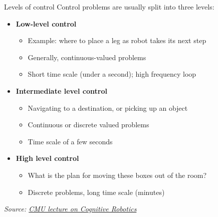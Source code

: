 \documentclass[compress]{beamer}
\newcommand{\source}[2]{{\tiny\it Source: \href{#1}{#2}}}
\begin{document}



\begin{frame}{Levels of control}
    Control problems are usually split into three levels:

    \begin{itemize}
        \item<1-> \textbf{Low-level control}
            \begin{itemize}
                \item Example: where to place a leg as robot takes its next step
                \item Generally, continuous-valued problems
                \item Short time scale (under a second); high frequency loop
            \end{itemize}
        \item<2-> \textbf{Intermediate level control}
            \begin{itemize}
                \item Navigating to a destination, or picking up an object
                \item Continuous or discrete valued problems
                \item Time scale of a few seconds
            \end{itemize}
        \item<3-> \textbf{High level control}
            \begin{itemize}
                \item What is the plan for moving these boxes out of the room?
                \item Discrete problems, long time scale (minutes)
            \end{itemize}
    \end{itemize}

    \source{https://www.cs.cmu.edu/afs/cs/academic/class/15494-s11/lectures/architectures.pdf}{CMU lecture on Cognitive Robotics}
\end{frame}
\end{document}
